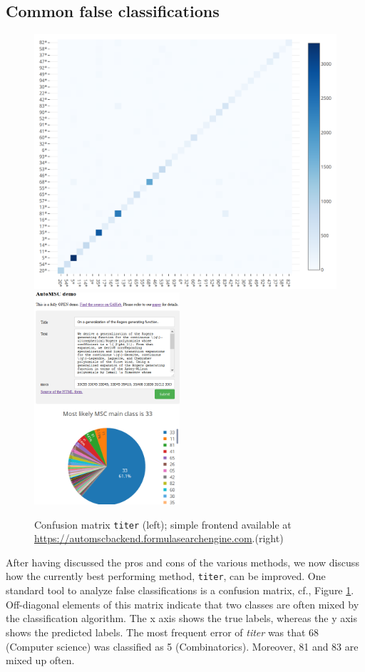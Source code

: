 \subsection{Common false classifications}
\begin{figure}[h]
  \centering
  \includegraphics[width=.48\textwidth]{confusion.png}
  \includegraphics[width=0.48\textwidth]{webFrontend.png}
  \caption{Confusion matrix \texttt{titer} (left); simple frontend available at
    \url{https://automscbackend.formulasearchengine.com}.(right)}\label{fgScreenshot}\label{fgConfusion}
\end{figure}
After having discussed the pros and cons of the various methods, we now discuss how the currently best performing method, \texttt{titer}, can be improved. 
One standard tool to analyze false classifications
is a confusion matrix, cf., Figure \ref{fgConfusion}.
Off-diagonal elements of this matrix indicate that two classes are often mixed by the classification algorithm.
The x axis shows the true labels, whereas the y axis shows the predicted labels.
The most frequent error of \textit{titer} was that 68 (Computer science) was classified as 5 (Combinatorics).
Moreover, 81 and 83 are mixed up often.

